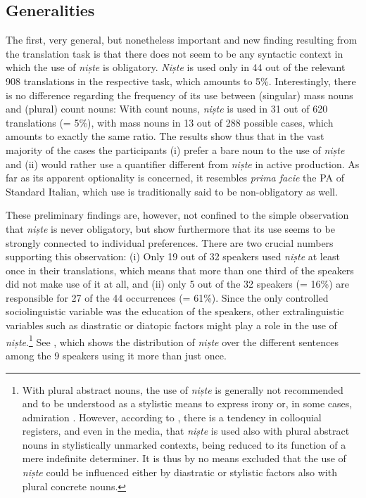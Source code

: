 \documentclass[output=paper,colorlinks,citecolor=brown]{langscibook}
\begin{document}
\subsection{Generalities}\label{sec:ds4.1}
The first, very general, but nonetheless important and new finding resulting from the translation task is that there does not seem to be any syntactic context in which the use of \textit{niște} is obligatory. \textit{Niște} is used only in 44 out of the relevant 908 translations in the respective task, which amounts to 5\%. Interestingly, there is no difference regarding the frequency of its use between (singular) mass nouns and (plural) count nouns: With count nouns, \textit{niște} is used in 31 out of 620 translations (= 5\%), with mass nouns in 13 out of 288 possible cases, which amounts to exactly the same ratio. The results show thus that in the vast majority of the cases the participants (i) prefer a bare noun to the use of \textit{niște} and (ii) would rather use a quantifier different from \textit{niște} in active production. As far as its apparent optionality is concerned, it resembles \textit{prima facie} the PA of Standard Italian, which use is traditionally said to be non-obligatory as well.

These preliminary findings are, however, not confined to the simple observation that \textit{niște} is never obligatory, but show furthermore that its use seems to be strongly connected to individual preferences. There are two crucial numbers supporting this observation: (i) Only 19 out of 32 speakers used \textit{niște} at least once in their translations, which means that more than one third of the speakers did not make use of it at all, and (ii) only 5 out of the 32 speakers (= 16\%) are responsible for 27 of the 44 occurrences (= 61\%). Since the only controlled sociolinguistic variable was the education of the speakers, other extralinguistic variables such as diastratic or diatopic factors might play a role in the use of \textit{niște}.\footnote{With plural abstract nouns, the use of \textit{niște} is generally not recommended \citep[79]{Avram1986} and to be understood as a stylistic means to express irony or, in some cases, admiration \citep[4--6]{Nedelcu2003}. However, according to \citet[5]{Nedelcu2003}, there is a tendency in colloquial registers, and even in the media, that \textit{niște} is used also with plural abstract nouns in stylistically unmarked contexts, being reduced to its function of a mere indefinite determiner. It is thus by no means excluded that the use of \textit{niște} could be influenced either by diastratic or stylistic factors also with plural concrete nouns.} See , which shows the distribution of \textit{niște} over the different sentences among the 9 speakers using it more than just once.
\end{document}
